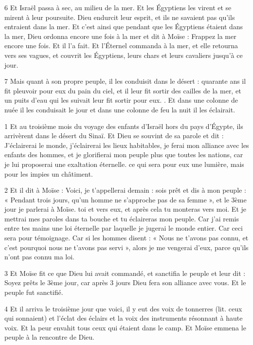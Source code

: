 \par 6 Et Israël passa à sec, au milieu de la mer. Et les Égyptiens les virent et se mirent à leur poursuite. Dieu endurcit leur esprit, et ils ne savaient pas qu'ils entraient dans la mer. Et c'est ainsi que pendant que les Égyptiens étaient dans la mer, Dieu ordonna encore une fois à la mer et dit à Moïse : Frappez la mer encore une fois. Et il l’a fait. Et l'Éternel commanda à la mer, et elle retourna vers ses vagues, et couvrit les Égyptiens, leurs chars et leurs cavaliers jusqu'à ce jour.

\par 7 Mais quant à son propre peuple, il les conduisit dans le désert : quarante ans il fit pleuvoir pour eux du pain du ciel, et il leur fit sortir des cailles de la mer, et un puits d'eau qui les suivait leur fit sortir pour eux. . Et dans une colonne de nuée il les conduisait le jour et dans une colonne de feu la nuit il les éclairait.


\par 1 Et au troisième mois du voyage des enfants d'Israël hors du pays d'Égypte, ils arrivèrent dans le désert du Sinaï. Et Dieu se souvint de sa parole et dit : J'éclairerai le monde, j'éclairerai les lieux habitables, je ferai mon alliance avec les enfants des hommes, et je glorifierai mon peuple plus que toutes les nations, car je lui proposerai une exaltation éternelle. ce qui sera pour eux une lumière, mais pour les impies un châtiment.

\par 2 Et il dit à Moïse : Voici, je t'appellerai demain : sois prêt et dis à mon peuple : « Pendant trois jours, qu'un homme ne s'approche pas de sa femme », et le 3ème jour je parlerai à Moïse. toi et vers eux, et après cela tu monteras vers moi. Et je mettrai mes paroles dans ta bouche et tu éclaireras mon peuple. Car j'ai remis entre tes mains une loi éternelle par laquelle je jugerai le monde entier. Car ceci sera pour témoignage. Car si les hommes disent : « Nous ne t’avons pas connu, et c’est pourquoi nous ne t’avons pas servi », alors je me vengerai d’eux, parce qu’ils n’ont pas connu ma loi.

\par 3 Et Moïse fit ce que Dieu lui avait commandé, et sanctifia le peuple et leur dit : Soyez prêts le 3ème jour, car après 3 jours Dieu fera son alliance avec vous. Et le peuple fut sanctifié.

\par 4 Et il arriva le troisième jour que voici, il y eut des voix de tonnerres (lit. ceux qui sonnaient) et l'éclat des éclairs et la voix des instruments résonnant à haute voix. Et la peur envahit tous ceux qui étaient dans le camp. Et Moïse emmena le peuple à la rencontre de Dieu.

